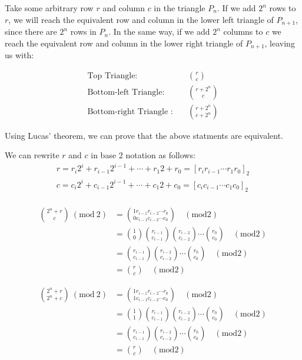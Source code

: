 \documentclass[a4paper,11pt,twoside]{article}
\begin{document}
Take some arbitrary row \(r\) and column \(c\) in the triangle \(P_{n}\). If we add \(2^{n}\) rows to \(r\), we will reach the equivalent row and column in the lower left triangle of \(P_{n+1}\), since there are \(2^{n}\) rows in \(P_{n}\). In the same way, if we add \(2^{n}\) columns to \(c\) we reach the equivalent row and column in the lower right triangle of \(P_{n+1}\), leaving us with:

\begin{align*}
\text{Top Triangle:} \quad &\binom{r}{c}  \\
\text{Bottom-left Triangle:}\quad &\binom{r + 2^n}{c}  \\
\text{Bottom-right Triangle :}\quad &\binom{r + 2^n}{c + 2^n} \label{eq:bottom-right}
\end{align*}

Using Lucas' theorem, we can prove that the above statments are equivalent.

We can rewrite \(r\) and \(c\) in base 2 notation as follows:
\begin{align*}
r=r_{i}2^{i}+r_{i-1}2^{i-1}+\cdots + r_{1}2+r_{0}= \left[r_{i}r_{i-1}\cdots r_{1}r_{0}\right]_2\\
c=c_{i}2^{i}+c_{i-1}2^{i-1}+\cdots +c_{1}2+c_{0}=\left[c_{i}c_{i-1}\cdots c_{1}c_{0}\right]_2\\
\end{align*}

\begin{align*}
\binom{2^n + r}{c}~(\text{mod}~2) &= \binom{1r_{i-1}r_{i-2} \cdots r_{0}}{0c_{i-1}c_{i-2} \cdots c_{0}} \quad (\text{mod} 2)\\
&= \binom{1}{0}\binom{r_{i-1}}{c_{i-1}}\binom{r_{i-2}}{c_{i-2}} \cdots \binom{r_0}{c_0} \quad (\text{mod} 2)\\
&=\binom{r_{i-1}}{c_{i-1}}\binom{r_{i-2}}{c_{i-2}} \cdots \binom{r_0}{c_0} \quad (\text{mod} 2)\\
&= \binom{r}{c} \quad (\text{mod} 2)
\end{align*}

\begin{align*}
\binom{2^n + r}{2^n + c}~(\text{mod}~2) &= \binom{1r_{i-1}r_{i-2} \cdots r_{0}}{1c_{i-1}c_{i-2} \cdots c_{0}} \quad (\text{mod} 2)\\
&= \binom{1}{1}\binom{r_{i-1}}{c_{i-1}}\binom{r_{i-2}}{c_{i-2}} \cdots \binom{r_0}{c_0} \quad (\text{mod} 2)\\
&=\binom{r_{i-1}}{c_{i-1}}\binom{r_{i-2}}{c_{i-2}} \cdots \binom{r_0}{c_0} \quad (\text{mod} 2)\\
&= \binom{r}{c} \quad (\text{mod} 2)
\end{align*}
\end{document}
